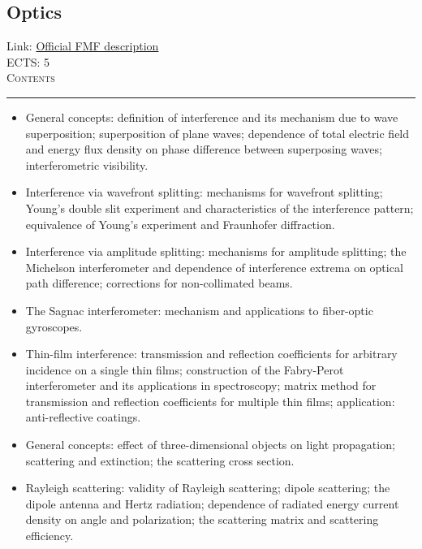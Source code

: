 \documentclass[11pt, a4paper]{article}
\newenvironment{course}[3]{
\subsection{#1}%
Link: \href{#2}{Official FMF description}\\%
ECTS: #3%
\vspace{1ex}
\\
{\large \textsc{Contents}}\\[-0.9ex]%
\rule{\textwidth}{0.5pt}
\vspace{-3ex}
}
{}
\newenvironment{chapter}[1]{
\begin{tcolorbox}[title=#1, breakable]
}
{\end{tcolorbox}}
\begin{document}
\begin{course}{Optics}{https://www.fmf.uni-lj.si/en/study-physics/programmes/1fiz/2020/7000777/courses/1165/}{5}
\begin{chapter}{Diffraction}
\begin{itemize}
        \end{itemize}
    \end{chapter}

    \begin{chapter}{Optical interference}
        \begin{itemize}
        
            \item General concepts: definition of interference and its mechanism due to wave superposition; superposition of plane waves; dependence of total electric field and energy flux density on phase difference between superposing waves; interferometric visibility.

            \item Interference via wavefront splitting: mechanisms for wavefront splitting; Young's double slit experiment and characteristics of the interference pattern; equivalence of Young's experiment and Fraunhofer diffraction.

            \item Interference via amplitude splitting: mechanisms for amplitude splitting; the Michelson interferometer and dependence of interference extrema on optical path difference; corrections for non-collimated beams.

            \item The Sagnac interferometer: mechanism and applications to fiber-optic gyroscopes.

            \item Thin-film interference: transmission and reflection coefficients for arbitrary incidence on a single thin films; construction of the Fabry-Perot interferometer and its applications in spectroscopy; matrix method for transmission and reflection coefficients for multiple thin films; application: anti-reflective coatings.

        \end{itemize}
    \end{chapter}

    \begin{chapter}{Optical scattering}
        \begin{itemize}
        
            \item General concepts: effect of three-dimensional objects on light propagation; scattering and extinction; the scattering cross section.

            \item Rayleigh scattering: validity of Rayleigh scattering; dipole scattering; the dipole antenna and Hertz radiation; dependence of radiated energy current density on angle and polarization; the scattering matrix and scattering efficiency.


\end{itemize}
\end{chapter}
\end{course}
\end{document}
